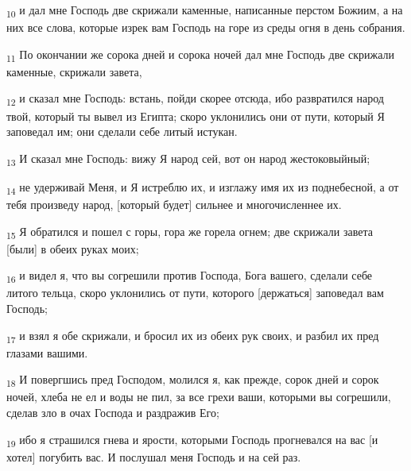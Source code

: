 \begin{tcolorbox}
\textsubscript{10} и дал мне Господь две скрижали каменные, написанные перстом Божиим, а на них все слова, которые изрек вам Господь на горе из среды огня в день собрания.
\end{tcolorbox}
\begin{tcolorbox}
\textsubscript{11} По окончании же сорока дней и сорока ночей дал мне Господь две скрижали каменные, скрижали завета,
\end{tcolorbox}
\begin{tcolorbox}
\textsubscript{12} и сказал мне Господь: встань, пойди скорее отсюда, ибо развратился народ твой, который ты вывел из Египта; скоро уклонились они от пути, который Я заповедал им; они сделали себе литый истукан.
\end{tcolorbox}
\begin{tcolorbox}
\textsubscript{13} И сказал мне Господь: вижу Я народ сей, вот он народ жестоковыйный;
\end{tcolorbox}
\begin{tcolorbox}
\textsubscript{14} не удерживай Меня, и Я истреблю их, и изглажу имя их из поднебесной, а от тебя произведу народ, [который будет] сильнее и многочисленнее их.
\end{tcolorbox}
\begin{tcolorbox}
\textsubscript{15} Я обратился и пошел с горы, гора же горела огнем; две скрижали завета [были] в обеих руках моих;
\end{tcolorbox}
\begin{tcolorbox}
\textsubscript{16} и видел я, что вы согрешили против Господа, Бога вашего, сделали себе литого тельца, скоро уклонились от пути, которого [держаться] заповедал вам Господь;
\end{tcolorbox}
\begin{tcolorbox}
\textsubscript{17} и взял я обе скрижали, и бросил их из обеих рук своих, и разбил их пред глазами вашими.
\end{tcolorbox}
\begin{tcolorbox}
\textsubscript{18} И повергшись пред Господом, молился я, как прежде, сорок дней и сорок ночей, хлеба не ел и воды не пил, за все грехи ваши, которыми вы согрешили, сделав зло в очах Господа и раздражив Его;
\end{tcolorbox}
\begin{tcolorbox}
\textsubscript{19} ибо я страшился гнева и ярости, которыми Господь прогневался на вас [и хотел] погубить вас. И послушал меня Господь и на сей раз.
\end{tcolorbox}
